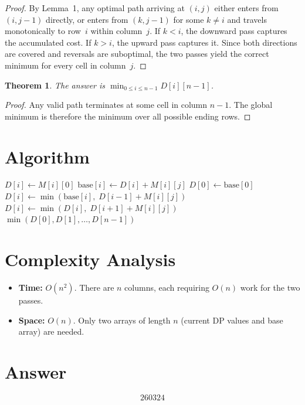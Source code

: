 \documentclass[12pt]{article}
\newtheorem{theorem}{Theorem}
\begin{document}
\begin{proof}
By Lemma~1, any optimal path arriving at $(i,j)$ either enters from $(i,j-1)$ directly, or enters from $(k,j-1)$ for some $k \neq i$ and travels monotonically to row~$i$ within column~$j$. If $k < i$, the downward pass captures the accumulated cost. If $k > i$, the upward pass captures it. Since both directions are covered and reversals are suboptimal, the two passes yield the correct minimum for every cell in column~$j$.
\end{proof}

\begin{theorem}
The answer is $\min_{0 \leq i \leq n-1} D[i][n-1]$.
\end{theorem}

\begin{proof}
Any valid path terminates at some cell in column $n-1$. The global minimum is therefore the minimum over all possible ending rows.
\end{proof}

\section{Algorithm}

\begin{algorithm}[H]
\caption{Minimum Path Sum (Three Ways)}
\begin{algorithmic}[1]
    \STATE $D[i] \gets M[i][0]$
\ENDFOR
{}
        \STATE $\text{base}[i] \gets D[i] + M[i][j]$
    \ENDFOR
    \STATE $D[0] \gets \text{base}[0]$
        \STATE $D[i] \gets \min(\text{base}[i],\; D[i-1] + M[i][j])$
    \ENDFOR
        \STATE $D[i] \gets \min(D[i],\; D[i+1] + M[i][j])$
    \ENDFOR
\ENDFOR
\RETURN $\min(D[0], D[1], \ldots, D[n-1])$
\end{algorithmic}
\end{algorithm}

\section{Complexity Analysis}

\begin{itemize}
    \item \textbf{Time:} $O(n^2)$. There are $n$ columns, each requiring $O(n)$ work for the two passes.
    \item \textbf{Space:} $O(n)$. Only two arrays of length $n$ (current DP values and base array) are needed.
\end{itemize}

\section{Answer}

\[
\boxed{260324}
\]
\end{document}
